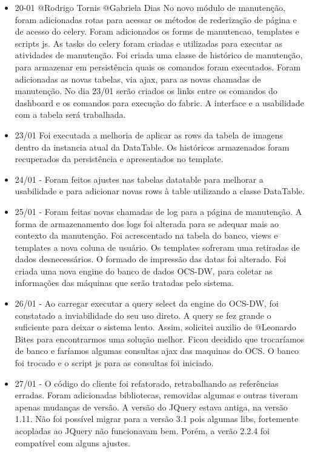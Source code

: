 \begin{itemize}
    \item 20-01 @Rodrigo Tornis @Gabriela Dias
  No novo módulo de manutenção, foram adicionadas rotas para acessar os métodos de rederização de página e de acesso do celery. Foram adicionados os forms de manutencao, templates e scripts js. As tasks do celery foram criadas e utilizadas para executar as atividades de manutenção. Foi criada uma classe de histórico de manutenção, para armazenar em persistência quais os comandos foram executados. Foram adicionadas as novas tabelas, via ajax, para as novas chamadas de manutenção.
  No dia 23/01 serão criados os links entre os comandos do dashboard e os comandos para execução do fabric. A interface e a usabilidade com a tabela será trabalhada.


    \item 23/01
  Foi executada a melhoria de aplicar as rows da tabela de imagens dentro da instancia atual da DataTable. Os históricos armazenados foram recuperados da persistência e apresentados no template.


    \item 24/01 - Foram feitos ajustes nas tabelas datatable para melhorar a usabilidade e para adicionar novas rows à table utilizando a classe DataTable.


    \item 25/01 - Foram feitas novas chamadas de log para a página de manutenção. A forma de armazenamento dos logs foi alterada para se adequar mais ao contexto da manutenção. Foi acrescentado na tabela do banco, views e templates a nova coluna de usuário. Os templates sofreram uma retiradas de dados desnecessários. O formado de impressão das datas foi alterado. Foi criada uma nova engine do banco de dados OCS-DW, para coletar as informações das máquinas que serão tratadas pelo sistema.


    \item 26/01 - Ao carregar executar a query select da engine do OCS-DW, foi constatado a inviabilidade do seu uso direto. A query se fez grande o suficiente para deixar o sistema lento. Assim, solicitei auxilio de @Leonardo Bites para encontrarmos uma solução melhor. Ficou decidido que trocaríamos de banco e faríamos algumas consultas ajax das maquinas do OCS. O banco foi trocado e o script js para as consultas foi iniciado.


    \item 27/01 - O código do cliente foi refatorado, retrabalhando as referências erradas. Foram adicionadas bibliotecas, removidas algumas e outras tiveram apenas mudanças de versão. A versão do JQuery estava antiga, na versão 1.11. Não foi possível migrar para a versão 3.1 pois algumas libs, fortemente acopladas ao JQuery não funcionavam bem. Porém, a verão 2.2.4 foi compatível com alguns ajustes.



\end{itemize}
